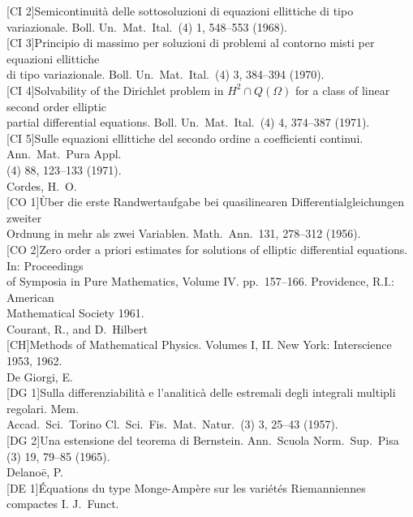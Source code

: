 
\begin{flushleft}
{}[CI 2]\quad Semicontinuit\`a delle sottosoluzioni di equazioni ellittiche di tipo variazionale. Boll. Un.\ Mat.\ Ital.\ (4) 1, 548--553 (1968).\\
{}[CI 3]\quad Principio di massimo per soluzioni di problemi al contorno misti per equazioni ellittiche\\
di tipo variazionale. Boll. Un.\ Mat.\ Ital.\ (4) 3, 384--394 (1970).\\
{}[CI 4]\quad Solvability of the Dirichlet problem in $H^2 \cap Q(\Omega)$ for a class of linear second order elliptic\\
partial differential equations. Boll. Un.\ Mat.\ Ital.\ (4) 4, 374--387 (1971).\\
{}[CI 5]\quad Sulle equazioni ellittiche del secondo ordine a coefficienti continui. Ann.\ Mat.\ Pura Appl.\\
(4) 88, 123--133 (1971).\\[1ex]
Cordes, H.\ O.\\
{}[CO 1]\quad \`Uber die erste Randwertaufgabe bei quasilinearen Differentialgleichungen zweiter\\
Ordnung in mehr als zwei Variablen. Math.\ Ann.\ 131, 278--312 (1956).\\
{}[CO 2]\quad Zero order a priori estimates for solutions of elliptic differential equations. In: Proceedings\\
of Symposia in Pure Mathematics, Volume IV. pp.\ 157--166. Providence, R.I.: American\\
Mathematical Society 1961.\\[1ex]
Courant, R., and D.\ Hilbert\\
{}[CH]\quad Methods of Mathematical Physics. Volumes I, II. New York: Interscience 1953, 1962.\\[1ex]
De Giorgi, E.\\
{}[DG 1]\quad Sulla differenziabilit\`a e l'analitic\`a delle estremali degli integrali multipli regolari. Mem.\\
Accad.\ Sci.\ Torino Cl.\ Sci.\ Fis.\ Mat.\ Natur.\ (3) 3, 25--43 (1957).\\
{}[DG 2]\quad Una estensione del teorema di Bernstein. Ann.\ Scuola Norm.\ Sup.\ Pisa (3) 19, 79--85 (1965).\\[1ex]
Delano\={e}, P.\\
{}[DE 1]\quad \'Equations du type Monge-Amp\`ere sur les vari\'et\'es Riemanniennes compactes I. J.\ Funct.\\

\end{flushleft}
